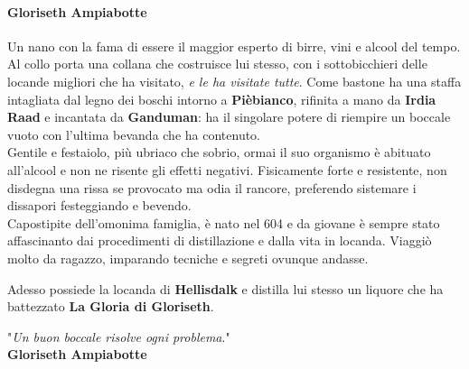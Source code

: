\documentclass[10pt,twoside,onecolumn,openany]{book}
\begin{document}
\paragraph{Gloriseth Ampiabotte} Un nano con la fama di essere il maggior esperto di birre, vini e alcool del tempo. Al collo porta una collana che costruisce lui stesso, con i sottobicchieri delle locande migliori che ha visitato, \textit{e le ha visitate tutte}. Come bastone ha una staffa intagliata dal legno dei boschi intorno a \textbf{Pièbianco}, rifinita a mano da \textbf{Irdia Raad} e incantata da \textbf{Ganduman}: ha il singolare potere di riempire un boccale vuoto con l'ultima bevanda che ha contenuto.\\
Gentile e festaiolo, più ubriaco che sobrio, ormai il suo organismo è abituato all'alcool e non ne risente gli effetti negativi. Fisicamente forte e resistente, non disdegna una rissa se provocato ma odia il rancore, preferendo sistemare i dissapori festeggiando e bevendo.\\
Capostipite dell'omonima famiglia, è nato nel 604 e da giovane è sempre stato affascinanto dai procedimenti di distillazione e dalla vita in locanda. Viaggiò molto da ragazzo, imparando tecniche e segreti ovunque andasse.
\begin{multicols}{2}
Adesso possiede la locanda di \textbf{Hellisdalk} e distilla lui stesso un liquore che ha battezzato \textbf{La Gloria di Gloriseth}.
\columnbreak
\begin{quotebox}
	"\textit{Un buon boccale risolve ogni problema}."\\ \textbf{Gloriseth Ampiabotte}
\end{quotebox}
\end{multicols}
\end{document}

